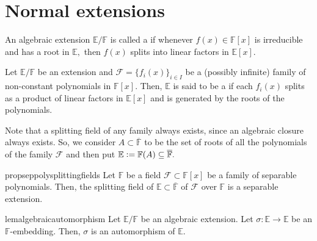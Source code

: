 \chapter{Normal extensions}

\begin{defn}%
    An algebraic extension $\mathbb{E}/\mathbb{F}$ is called a  if whenever $f(x) \in \mathbb{F}[x]$ is irreducible and has a root in $\mathbb{E},$ then $f(x)$ splits into linear factors in $\mathbb{E}[x].$ 
\end{defn}

\begin{defn}%
    Let $\mathbb{E}/\mathbb{F}$ be an extension and $\mathcal{F} = \{f_i(x)\}_{i \in I}$ be a (possibly infinite) family of non-constant polynomials in $\mathbb{F}[x].$ Then, $\mathbb{E}$ is said to be a  if each $f_i(x)$ splits as a product of linear factors in $\mathbb{E}[x]$ and is generated by the roots of the polynomials.
\end{defn}

\begin{rem} \label{rem:splitfamilyexists}
    Note that a splitting field of any family always exists, since an algebraic closure always exists. So, we consider $A \subset \overline{\mathbb{F}}$ to be the set of roots of all the polynomials of the family $\mathcal{F}$ and then put $\mathbb{E} \vcentcolon= \mathbb{F}(A) \subset \overline{\mathbb{F}}.$
\end{rem}

\begin{restatable}[]{prop}{seppolysplittingfields}
\label{prop:seppolysplittingfields}
    Let $\mathbb{F}$ be a field $\mathcal{F} \subset \mathbb{F}[x]$ be a family of separable polynomials. Then, the splitting field of $\mathbb{E} \subset \overline{\mathbb{F}}$ of $\mathcal{F}$ over $\mathbb{F}$ is a separable extension. \hfill\hyperref[prop:seppolysplittingfields2]{\downsym}
\end{restatable}

\begin{restatable}[]{lem}{algebraicautomorphism}
\label{lem:algebraicautomorphism}
    Let $\mathbb{E}/\mathbb{F}$ be an algebraic extension. Let $\sigma : \mathbb{E} \to \mathbb{E}$ be an $\mathbb{F}$-embedding. Then, $\sigma$ is an automorphism of $\mathbb{E}.$ \hfill\hyperref[lem:algebraicautomorphism2]{\downsym}
\end{restatable}

